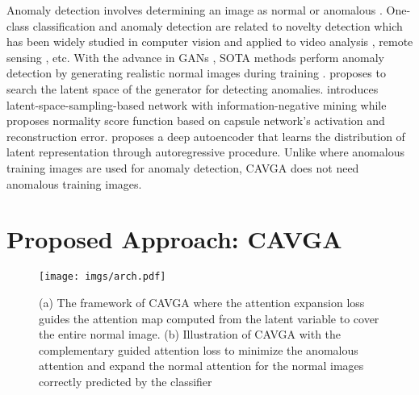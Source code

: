 \documentclass[runningheads]{llncs}
\begin{document}
Anomaly detection involves determining an image as normal or anomalous \cite{akcay2018ganomaly}. One-class classification and anomaly detection are related to novelty detection \cite{perera2019ocgan} which has been widely studied in computer vision \cite{masana2018metric, hendrycks2018deep,akcay2018ganomaly, vu2019anomaly,napoletano2018anomaly} and applied to video analysis \cite{cheng2013abnormal}, remote sensing \cite{matteoli2014overview}, etc. With the advance in GANs \cite{goodfellow2014generative}, SOTA methods perform anomaly detection by generating realistic normal images during training \cite{Kimura_2020_WACV,radford2015unsupervised, sabokrou2018adversarially,schlegl2017unsupervised, higgins2017beta}.   \cite{deecke2018image} proposes to search the latent space of the generator for detecting anomalies. \cite{perera2019ocgan} introduces latent-space-sampling-based network with information-negative mining while \cite{li2019exploring} proposes normality score function based on capsule network’s activation and reconstruction error. \cite{abati2019latent} proposes a deep autoencoder that learns the distribution of latent representation through autoregressive procedure. Unlike  \cite{ruff2019deep, bian2019novel, wang2019inductive, daniel2019deep} where anomalous training images are used for anomaly detection, CAVGA does not need anomalous training images. 


\section{Proposed Approach: CAVGA}
\label{approach}

\begin{figure}[t!]
\centering
\texttt{[image: imgs/arch.pdf]}

\caption{
(a) The framework of CAVGA where the attention expansion loss  guides the attention map  computed from the latent variable  to cover the entire normal image. (b) Illustration of CAVGA with the complementary guided attention loss  to minimize the anomalous attention  and expand the normal attention  for the normal images correctly predicted by the classifier} 
\label{framework}

\end{figure}
\end{document}
